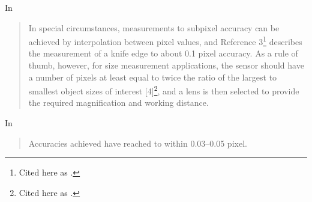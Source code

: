 \documentclass[a4paper,12pt]{article}
\begin{document}
In \cite{eren2014measurement}
\begin{quotation}
In special circumstances, measurements to subpixel accuracy can be achieved by
interpolation between pixel values, and Reference 3\footnote{Cited here as \cite{knives}.} describes the measurement of a knife edge to about
0.1 pixel accuracy. As a rule of thumb, however, for size measurement applications, the sensor should
have a number of pixels at least equal to twice the ratio of the largest to smallest object sizes of interest
[4]\footnote{Cited here as \cite{hopwood1980design}.}, and a lens is then selected to provide the required magnification and working distance.
\end{quotation}

In \cite{MIKHAIL198463}
\begin{quotation}
Accuracies achieved have reached to within 0.03–0.05 pixel.
\end{quotation}

\printbibliography
\end{document}
